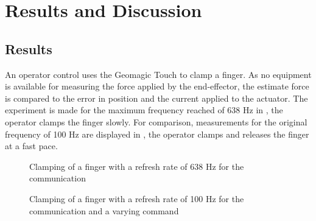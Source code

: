 \chapter{Results and Discussion}\label{cha:discussion}





\section{Results}



An operator control uses the Geomagic Touch to clamp a finger. As no equipment is available for measuring the force applied by the end-effector, the estimate force is compared to the error in position and the current applied to the actuator. The experiment is made for the maximum frequency reached of 638 Hz in , the operator clamps the finger slowly. For comparison, measurements for the original frequency of 100 Hz are displayed in , the operator clamps and releases the finger at a fast pace.


\begin{figure}[H]
  
  \caption{Clamping of a finger with a refresh rate of 638 Hz for the communication}
  \label{fig:fbkm}
\end{figure}

\begin{figure}[H]
  
  \caption{Clamping of a finger with a refresh rate of 100 Hz for the communication and a varying command}
  \label{fig:fbkm_100}
\end{figure}

